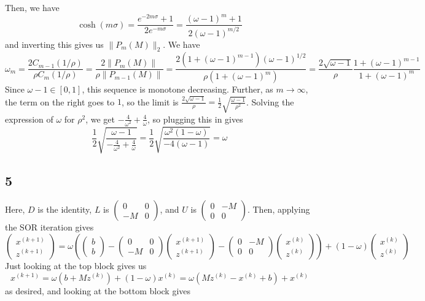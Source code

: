 \documentclass{article}
\newcommand{\openm}{\begin{pmatrix}}
\newcommand{\closem}{\end{pmatrix}}
\begin{document}
Then, we have
\[\cosh(m\sigma)=\frac{e^{-2m\sigma}+1}{2e^{-m\sigma}}=\frac{(\omega-1)^m+1}{2(\omega-1)^{m/2}}\]
and inverting this gives us $\|P_m(M)\|_2$.
We have
\[\omega_m=\frac{2C_{m-1}(1/\rho)}{\rho C_{m}(1/\rho)}=\frac{2\|P_m(M)\|}{\rho\|P_{m-1}(M)\|}=\frac{2(1+(\omega-1)^{m-1})(\omega-1)^{1/2}}{\rho(1+(\omega-1)^m)}=\frac{2\sqrt{\omega-1}}{\rho}\frac{1+(\omega-1)^{m-1}}{1+(\omega-1)^m}\]
Since $\omega-1\in[0,1]$, this sequence is monotone decreasing. Further, as $m\to\infty$, the term on the right goes to $1$, so the limit is $\frac{2\sqrt{\omega-1}}{\rho}=\frac{1}{2}\sqrt{\frac{\omega-1}{\rho^2}}$. Solving the expression of $\omega$ for $\rho^2$, we get $-\frac{4}{\omega^2}+\frac{4}{\omega}$, so plugging this in gives
\[\frac{1}{2}\sqrt{\frac{\omega-1}{-\frac{4}{\omega^2}+\frac{4}{\omega}}}=\frac{1}{2}\sqrt{\frac{\omega^2(1-\omega)}{-4(\omega-1)}}=\omega\]

\subsection*{5}
Here, $D$ is the identity, $L$ is $\openm0&0\\-M&0\closem$, and $U$ is $\openm0&-M\\0&0\closem$. Then, applying the SOR iteration gives
\[\openm x^{(k+1)}\\z^{(k+1)}\closem=\omega\left(\openm b\\b\closem-\openm0&0\\-M&0\closem\openm x^{(k+1)}\\z^{(k+1)}\closem-\openm0&-M\\0&0\closem\openm x^{(k)}\\z^{(k)}\closem\right)+(1-\omega)\openm x^{(k)}\\z^{(k)}\closem\]
Just looking at the top block gives us
\[x^{(k+1)}=\omega(b+Mz^{(k)})+(1-\omega)x^{(k)}=\omega(Mz^{(k)}-x^{(k)}+b)+x^{(k)}\]
as desired, and looking at the bottom block gives
\end{document}
